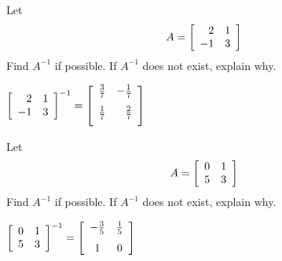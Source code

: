 \begin{enumialphparenastyle}

\begin{ex} Let
\begin{equation*}
A=\left[
\begin{array}{rr}
2 & 1 \\
-1 & 3
\end{array}
\right] 
\end{equation*}
Find $A^{-1}$ if possible. If $A^{-1}$ does not exist, explain why. 
\begin{sol}
$\leftB
\begin{array}{rr}
2 & 1 \\
-1 & 3
\end{array}
\rightB^{-1}= \leftB
\begin{array}{rr}
\vspace{0.05in}\frac{3}{7} & -\vspace{0.05in}\frac{1}{7} \\
\vspace{0.05in}\frac{1}{7} & \vspace{0.05in}\frac{2}{7}
\end{array}
\rightB$
\end{sol}
\end{ex}

\begin{ex}Let
\begin{equation*}
A=\left[
\begin{array}{rr}
0 & 1 \\
5 & 3
\end{array}
\right] 
\end{equation*}
Find $A^{-1}$ if possible. If $A^{-1}$ does not exist, explain why. 
\begin{sol}
$\leftB
\begin{array}{cc}
0 & 1 \\
5 & 3
\end{array}
\rightB^{-1}= \leftB
\begin{array}{cc}
-\vspace{0.05in}\frac{3}{5} & \vspace{0.05in}\frac{1}{5} \\
1 & 0
\end{array}
\rightB$
\end{sol}
\end{ex}


\end{enumialphparenastyle}

